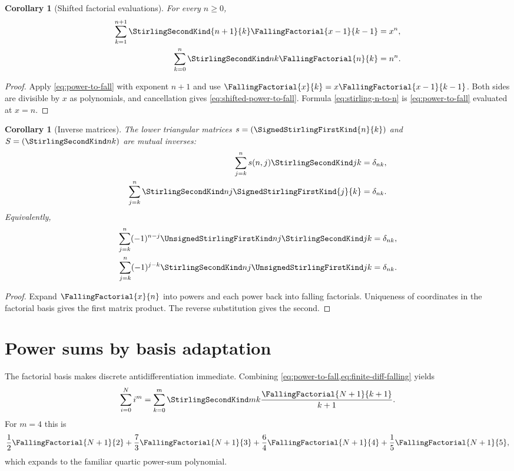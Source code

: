 \documentclass[11pt,a4paper,oneside,openany]{book}
\newtheorem{corollary}[theorem]{Corollary}
\theoremstyle{definition}
\theoremstyle{remark}
\begin{document}
\begin{corollary}[Shifted factorial evaluations]
\label{cor:shifted-stirling-evaluations}
For every $n\ge0$,
\begin{align}
 \sum_{k=1}^{n+1}\StirlingSecondKind{n+1}{k}\FallingFactorial{x-1}{k-1}&=x^n,
 \label{eq:shifted-power-to-fall}\\
 \sum_{k=0}^{n}\StirlingSecondKind nk\FallingFactorial{n}{k}&=n^n.
 \label{eq:stirling-n-to-n}
\end{align}
\end{corollary}
\begin{proof}
Apply \eqref{eq:power-to-fall} with exponent $n+1$ and use
$\FallingFactorial{x}{k}=x\FallingFactorial{x-1}{k-1}$.  Both sides are divisible by $x$ as
polynomials, and cancellation gives \eqref{eq:shifted-power-to-fall}.  Formula
\eqref{eq:stirling-n-to-n} is \eqref{eq:power-to-fall} evaluated at $x=n$.
\end{proof}
\begin{corollary}[Inverse matrices]\label{cor:stirling-inverse}
The lower triangular matrices $s=(\SignedStirlingFirstKind{n}{k})$ and $S=(\StirlingSecondKind nk)$ are mutual inverses:
\begin{align}
 \sum_{j=k}^ns(n,j)\StirlingSecondKind jk&=\delta_{nk},\label{eq:stirling-inv1}\\
 \sum_{j=k}^n\StirlingSecondKind nj \SignedStirlingFirstKind{j}{k}&=\delta_{nk}.\label{eq:stirling-inv2}
\end{align}
Equivalently,
\begin{align}
 \sum_{j=k}^n(-1)^{n-j}\UnsignedStirlingFirstKind nj\StirlingSecondKind jk&=\delta_{nk},\\
 \sum_{j=k}^n(-1)^{j-k}\StirlingSecondKind nj\UnsignedStirlingFirstKind jk&=\delta_{nk}.
\end{align}
\end{corollary}
\begin{proof}
Expand $\FallingFactorial{x}{n}$ into powers and each power back into falling factorials.
Uniqueness of coordinates in the factorial basis gives the first matrix product.
The reverse substitution gives the second.
\end{proof}

\section{Power sums by basis adaptation}
The factorial basis makes discrete antidifferentiation immediate.  Combining
\cref{eq:power-to-fall,eq:finite-diff-falling} yields
\begin{equation}\label{eq:power-sum-stirling}
 \sum_{i=0}^{N}i^m
 =\sum_{k=0}^m\StirlingSecondKind mk\frac{\FallingFactorial{N+1}{k+1}}{k+1}.
\end{equation}
For $m=4$ this is
\[
 \frac12\FallingFactorial{N+1}{2}+\frac73\FallingFactorial{N+1}{3}
 +\frac64\FallingFactorial{N+1}{4}+\frac15\FallingFactorial{N+1}{5},
\]
which expands to the familiar quartic power-sum polynomial.
\end{document}
